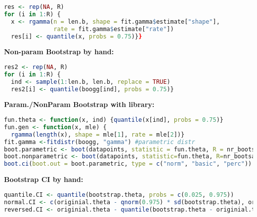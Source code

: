 \begin{lstlisting}[language=R]
res <- rep(NA, R)
for (i in 1:R) {
  x <- rgamma(n = len.b, shape = fit.gamma$estimate["shape"],
              rate = fit.gamma$estimate["rate"])
  res[i] <- quantile(x, probs = 0.75)}}
\end{lstlisting}
\textbf{Non-param Bootstrap by hand:}
\begin{lstlisting}[language=R]
res2 <- rep(NA, R)
for (i in 1:R) {
  ind <- sample(1:len.b, len.b, replace = TRUE)
  res2[i] <- quantile(boogg[ind], probs = 0.75)}
\end{lstlisting}
\textbf{Param./NonParam Bootstrap with library:} 
\begin{lstlisting}[language=R]
fun.theta <- function(x, ind) {quantile(x[ind], probs = 0.75)}
fun.gen <- function(x, mle) {
  rgamma(length(x), shape = mle[1], rate = mle[2])}
fit.gamma <-fitdistr(boogg, "gamma") #parametric distr
boot.parametric <- boot(datapoints, statistic = fun.theta, R = nr_bootsamples, sim = "parametric", ran.gen = fun.gen, mle = fit.gamma$estimate) #parametric bootstrap
boot.nonparametric <- boot(datapoints, statistic=fun.theta, R=nr_bootsamples)#nonparam bootstrap
boot.ci(boot.out = boot.parametric, type = c("norm", "basic", "perc")) #all confidence intervals, norm = normal, basic = reversed quantile, perc =  quantile, stud = bootstrap T
\end{lstlisting}
\textbf{Bootstrap CI by hand:}
\begin{lstlisting}[language=R]
quantile.CI <- quantile(bootstrap.theta, probs = c(0.025, 0.975))
normal.CI <- c(originial.theta - qnorm(0.975) * sd(bootstrap.theta), originial.theta + qnorm(0.975) * sd(bootstrap.theta))
reversed.CI <- originial.theta - quantile(bootstrap.theta - originial.theta, probs = c(0.975, 0.025))
\end{lstlisting}